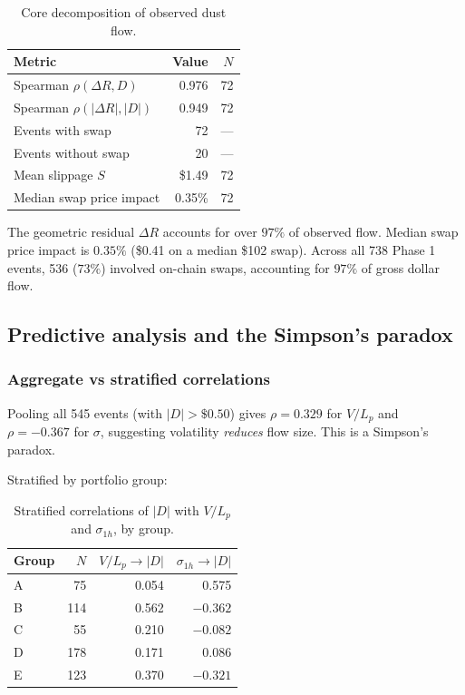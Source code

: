 \documentclass[11pt,a4paper]{article}
\begin{document}
\begin{table}[H]
\centering
\caption{Core decomposition of observed dust flow.}\label{tab:decomposition}
\begin{tabular}{@{}lrr@{}}
\toprule
Metric & Value & $N$ \\
\midrule
Spearman $\rho(\Delta R, D)$                 & 0.976 & 72 \\
Spearman $\rho(|\Delta R|, |D|)$             & 0.949 & 72 \\
Events with swap                              & 72             & --- \\
Events without swap                           & 20             & --- \\
Mean slippage $S$                             & \$1.49         & 72 \\
Median swap price impact                      & 0.35\% & 72 \\
\bottomrule
\end{tabular}
\end{table}

The geometric residual $\Delta R$ accounts for over $97\%$ of observed flow. Median swap price impact is $0.35\%$ (\$0.41 on a median \$102 swap). Across all 738 Phase 1 events, 536 ($73\%$) involved on-chain swaps, accounting for $97\%$ of gross dollar flow.

\subsection{Predictive analysis and the Simpson's paradox}\label{sec:predictive}

\subsubsection*{Aggregate vs stratified correlations}

Pooling all 545 events (with $|D| > \$0.50$) gives $\rho = 0.329$ for $V/L_p$ and $\rho = -0.367$ for $\sigma$, suggesting volatility \emph{reduces} flow size. This is a Simpson's paradox.

Stratified by portfolio group:

\begin{table}[H]
\centering
\caption{Stratified correlations of $|D|$ with $V/L_p$ and $\sigma_{1h}$, by group.}\label{tab:stratified}
\begin{tabular}{@{}lrrr@{}}
\toprule
Group & $N$ & $V/L_p \to |D|$ & $\sigma_{1h} \to |D|$ \\
\midrule
A & 75  & 0.054           & 0.575 \\
B & 114 & 0.562  & $-0.362$ \\
C & 55  & 0.210           & $-0.082$ \\
D & 178 & 0.171           & $0.086$ \\
E & 123 & 0.370  & $-0.321$ \\
\bottomrule
\end{tabular}
\end{table}
\end{document}
